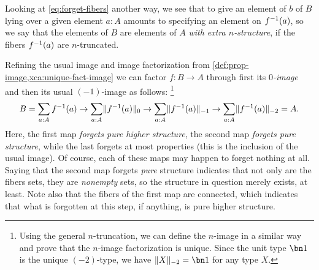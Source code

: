 Looking at \eqref{eq:forget-fibers} another way,
we see that to give an element of $b$ of $B$ lying
over a given element $a:A$ amounts to
specifying an element on $f^{-1}(a)$,
so we say that the elements of $B$
are elements of $A$ \emph{with extra $n$-structure},
if the fibers $f^{-1}(a)$ are $n$-truncated.

Refining the usual image and image factorization from
\cref{def:prop-image,xca:unique-fact-image}
we can factor $f : B \to A$ through
first its \emph{$0$-image}
and then its usual $(-1)$-image as follows:%
\footnote{Using the general $n$-truncation,
  we can define the $n$-image
  in a similar way and prove that
  the $n$-image factorization is unique.
  Since the unit type $\bn 1$ is the unique $(-2)$-type,
  we have $\Trunc{X}_{-2} = \bn 1$ for any type $X$.}
\[
  B = \sum_{a:A} f^{-1}(a) \to
  \sum_{a:A} \lVert f^{-1}(a)\rVert_0 \to
  \sum_{a:A} \lVert f^{-1}(a)\rVert_{-1} \to
  \sum_{a:A} \lVert f^{-1}(a)\rVert_{-2} = A.
\]
Here, the first map \emph{forgets pure higher structure},
the second map \emph{forgets pure structure},
while the last forgets at most properties
(this is the inclusion of the usual image).
Of course, each of these maps may happen to forget nothing at all.
Saying that the second map forgets \emph{pure} structure
indicates that not only are the fibers sets,
they are \emph{nonempty} sets,
so the structure in question merely exists, at least.
Note also that the fibers of the first map are connected,
which indicates that what is forgotten at this step, if anything,
is pure higher structure.

